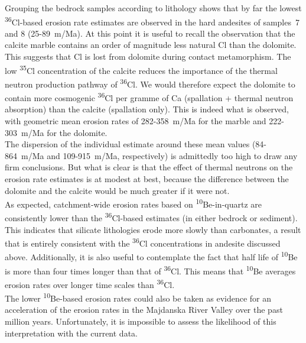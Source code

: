 \documentclass[titlepage]{article}
\begin{document}
Grouping the bedrock samples according to lithology shows that by far
the lowest \textsuperscript{36}Cl-based erosion rate estimates are
observed in the hard andesites of samples~7 and 8 (25-89~m/Ma). At
this point it is useful to recall the observation that the calcite
marble contains an order of magnitude less natural Cl than the
dolomite. This suggests that Cl is lost from dolomite during contact
metamorphism. The low \textsuperscript{35}Cl concentration of the
calcite reduces the importance of the thermal neutron production
pathway of \textsuperscript{36}Cl. We would therefore expect the
dolomite to contain more cosmogenic \textsuperscript{36}Cl per gramme
of Ca (spallation + thermal neutron absorption) than the calcite
(spallation only).  This is indeed what is observed, with geometric
mean erosion rates of 282-358~m/Ma for the marble and 222-303~m/Ma for
the dolomite.\\

The dispersion of the individual estimate around these mean values
(84-864~m/Ma and 109-915~m/Ma, respectively) is admittedly too high to
draw any firm conclusions.  But what is clear is that the effect of
thermal neutrons on the erosion rate estimates is at modest at best,
because the difference between the dolomite and the calcite would be
much greater if it were not.\\

As expected, catchment-wide erosion rates based on
\textsuperscript{10}Be-in-quartz are consistently lower than the
\textsuperscript{36}Cl-based estimates (in either bedrock or
sediment). This indicates that silicate lithologies erode more slowly
than carbonates, a result that is entirely consistent with the
\textsuperscript{36}Cl concentrations in andesite discussed
above. Additionally, it is also useful to contemplate the fact that
half life of \textsuperscript{10}Be is more than four times longer
than that of \textsuperscript{36}Cl. This means that
\textsuperscript{10}Be averages erosion rates over longer time scales
than \textsuperscript{36}Cl.\\

The lower \textsuperscript{10}Be-based erosion rates could also be
taken as evidence for an acceleration of the erosion rates in the
Majdanska River Valley over the past million years. Unfortunately, it
is impossible to assess the likelihood of this interpretation with the
current data.\\
\end{document}
